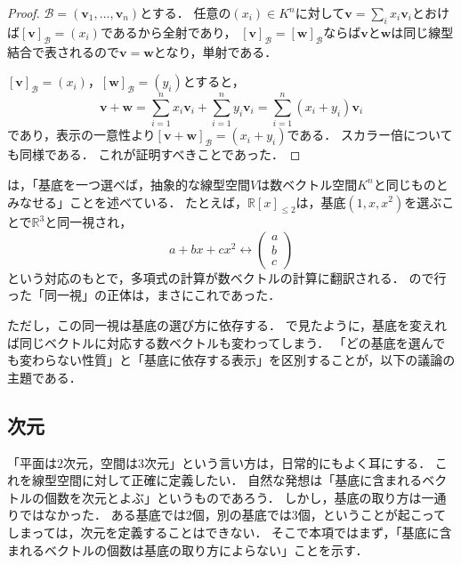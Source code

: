 \begin{tleftbar}
\begin{proof}
  $\mathcal{B} = (\bm{v}_1, \dots, \bm{v}_n)$とする．
  任意の$(x_i)\in K^n$に対して$\bm{v}=\sum_i x_i\bm{v}_i$とおけば$[\bm{v}]_{\mathcal{B}}=(x_i)$であるから全射であり，
  $[\bm{v}]_{\mathcal{B}}=[\bm{w}]_{\mathcal{B}}$ならば$\bm{v}$と$\bm{w}$は同じ線型結合で表されるので$\bm{v}=\bm{w}$となり，単射である．

  $[\bm{v}]_{\mathcal{B}} = (x_i)$，$[\bm{w}]_{\mathcal{B}} = (y_i)$とすると，
  \[
    \bm{v} + \bm{w}
    = \sum_{i=1}^{n} x_i \bm{v}_i + \sum_{i=1}^{n} y_i \bm{v}_i
    = \sum_{i=1}^{n} (x_i + y_i) \bm{v}_i
  \]
  であり，表示の一意性より$[\bm{v} + \bm{w}]_{\mathcal{B}} = (x_i + y_i)$である．
  スカラー倍についても同様である．
  これが証明すべきことであった．
\end{proof}
\end{tleftbar}

\begin{remark}
  は，「基底を一つ選べば，抽象的な線型空間$V$は数ベクトル空間$K^n$と同じものとみなせる」ことを述べている．
  たとえば，$\mathbb{R}[x]_{\le 2}$は，基底$(1, x, x^2)$を選ぶことで$\mathbb{R}^3$と同一視され，
  \[
    a + bx + cx^2 \longleftrightarrow \begin{pmatrix} a \\ b \\ c \end{pmatrix}
  \]
  という対応のもとで，多項式の計算が数ベクトルの計算に翻訳される．
  ので行った「同一視」の正体は，まさにこれであった．

  ただし，この同一視は基底の選び方に依存する．
  で見たように，基底を変えれば同じベクトルに対応する数ベクトルも変わってしまう．
  「どの基底を選んでも変わらない性質」と「基底に依存する表示」を区別することが，以下の議論の主題である．
\end{remark}

\subsection{次元}

「平面は$2$次元，空間は$3$次元」という言い方は，日常的にもよく耳にする．
これを線型空間に対して正確に定義したい．
自然な発想は「基底に含まれるベクトルの個数を次元とよぶ」というものであろう．
しかし，基底の取り方は一通りではなかった．
ある基底では$2$個，別の基底では$3$個，ということが起こってしまっては，次元を定義することはできない．
そこで本項ではまず，「基底に含まれるベクトルの個数は基底の取り方によらない」ことを示す．

